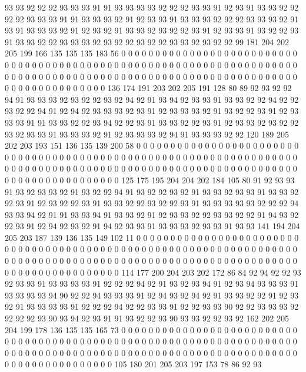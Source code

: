 93 93 92 92 92 93 93 93 91 91 93 93 93 93 92 92 92 93 93 91
92 93 91 93 93 92 92 92 92 93 93 93 91 91 93 93 93 92 91 92
93 93 91 93 93 93 92 92 92 93 93 93 92 91 93 91 93 93 93 92
91 92 93 92 91 93 93 92 93 92 92 93 91 92 93 93 91 93 92 92
93 91 93 93 92 92 93 93 93 92 93 92 92 93 92 92 93 93 92 93
92 92 99 181 204 202 205 199 166 135 135 135 183 56 0 0 0 0 0 0
0 0 0 0 0 0 0 0 0 0 0 0 0 0 0 0 0 0 0 0
0 0 0 0 0 0 0 0 0 0 0 0 0 0 0 0 0 0 0 0
0 0 0 0 0 0 0 0 0 0 0 0 0 0 0 0 0 0 0 0
0 0 0 0 0 0 0 0 0 0 0 0 0 0 0 0 0 0 0 0
0 0 0 0 0 0 0 0 0 0 0 0 0 0 0 0 0 0 0 0
0 0 0 0 0 0 0 0 0 0 0 0 0 0 0 0 0 0 0 0
0 136 174 191 203 202 205 191 128 80 89 92 93 92 92 94 91 93 93 93
92 93 92 92 93 92 94 92 91 93 94 92 93 93 91 93 93 92 92 94
92 92 93 92 92 94 91 92 94 92 93 93 93 92 93 91 92 93 93 93
92 91 93 92 92 93 91 92 93 93 93 91 91 93 93 92 92 93 94 92
92 93 91 93 93 92 92 93 91 92 93 93 92 93 92 92 93 92 93 93
91 93 93 93 92 91 92 93 93 93 92 94 91 93 93 93 92 92 120 189
205 202 203 193 151 136 135 139 200 58 0 0 0 0 0 0 0 0 0 0
0 0 0 0 0 0 0 0 0 0 0 0 0 0 0 0 0 0 0 0
0 0 0 0 0 0 0 0 0 0 0 0 0 0 0 0 0 0 0 0
0 0 0 0 0 0 0 0 0 0 0 0 0 0 0 0 0 0 0 0
0 0 0 0 0 0 0 0 0 0 0 0 0 0 0 0 0 0 0 0
0 0 0 0 0 0 0 0 0 0 0 0 0 0 0 0 0 0 0 0
0 0 0 0 0 0 0 0 0 0 0 0 0 0 0 0 0 125 175 195
204 204 202 184 105 80 91 92 93 93 91 93 92 93 93 92 91 93 92 92
94 91 93 92 92 93 92 91 93 93 92 93 93 91 93 93 92 92 93 91
92 93 92 92 93 91 93 93 92 92 93 92 92 93 91 93 93 93 93 93
92 92 92 94 93 93 94 92 91 91 93 93 94 91 93 93 92 91 92 93
93 92 92 93 93 92 92 91 94 93 92 92 93 91 92 94 92 93 92 91
94 92 93 93 91 93 93 93 92 93 93 91 93 93 141 194 204 205 203 187
139 136 135 149 102 11 0 0 0 0 0 0 0 0 0 0 0 0 0 0
0 0 0 0 0 0 0 0 0 0 0 0 0 0 0 0 0 0 0 0
0 0 0 0 0 0 0 0 0 0 0 0 0 0 0 0 0 0 0 0
0 0 0 0 0 0 0 0 0 0 0 0 0 0 0 0 0 0 0 0
0 0 0 0 0 0 0 0 0 0 0 0 0 0 0 0 0 0 0 0
0 0 0 0 0 0 0 0 0 0 0 0 0 0 0 0 0 0 0 0
0 0 0 0 0 0 0 0 0 0 0 0 0 114 177 200 204 203 202 172
86 84 92 94 92 92 93 92 93 93 91 93 93 93 93 91 92 92 92 94
92 91 93 92 93 94 91 92 93 94 93 93 93 91 93 93 93 93 94 90
92 92 94 93 93 93 91 92 94 93 92 94 92 91 93 93 92 92 91 92
93 92 91 93 93 93 93 91 92 92 92 94 92 92 93 93 91 92 92 93
93 90 92 92 93 93 93 92 92 92 92 93 90 93 94 92 93 91 91 93
92 92 93 90 93 93 92 92 93 92 162 202 205 204 199 178 136 135 135 165
73 0 0 0 0 0 0 0 0 0 0 0 0 0 0 0 0 0 0 0
0 0 0 0 0 0 0 0 0 0 0 0 0 0 0 0 0 0 0 0
0 0 0 0 0 0 0 0 0 0 0 0 0 0 0 0 0 0 0 0
0 0 0 0 0 0 0 0 0 0 0 0 0 0 0 0 0 0 0 0
0 0 0 0 0 0 0 0 0 0 0 0 0 0 0 0 0 0 0 0
0 0 0 0 0 0 0 0 0 0 0 0 0 0 0 0 0 0 0 0
0 0 0 0 0 0 0 0 0 105 180 201 205 203 197 153 78 86 92 93
